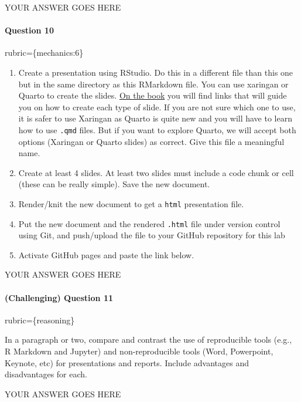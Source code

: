 \documentclass[
]{article}
\providecommand{\tightlist}{%
  \setlength{\itemsep}{0pt}\setlength{\parskip}{0pt}}
\begin{document}
YOUR ANSWER GOES HERE

\begin{alert alert-info}
\hypertarget{question-10}{%
\paragraph{Question 10}\label{question-10}}

rubric=\{mechanics:6\}

\begin{enumerate}
\def\labelenumi{\arabic{enumi}.}
\tightlist
\item
  Create a presentation using RStudio. Do this in a different file than
  this one but in the same directory as this RMarkdown file. You can use
  xaringan or Quarto to create the slides.
  \href{https://pages.github.ubc.ca/MDS-2022-23/DSCI_521_platforms-dsci_students/materials/lectures/8-rmarkdown-quarto-slides-ghpages.html}{On
  the book} you will find links that will guide you on how to create
  each type of slide. If you are not sure which one to use, it is safer
  to use Xaringan as Quarto is quite new and you will have to learn how
  to use \texttt{.qmd} files. But if you want to explore Quarto, we will
  accept both options (Xaringan or Quarto slides) as correct. Give this
  file a meaningful name.
\item
  Create at least 4 slides. At least two slides must include a code
  chunk or cell (these can be really simple). Save the new document.
\item
  Render/knit the new document to get a \texttt{html} presentation file.
\item
  Put the new document and the rendered \texttt{.html} file under
  version control using Git, and push/upload the file to your GitHub
  repository for this lab
\item
  Activate GitHub pages and paste the link below.
\end{enumerate}
\end{alert alert-info}

YOUR ANSWER GOES HERE

\begin{alert alert-info}
\hypertarget{challenging-question-11}{%
\paragraph{(Challenging) Question 11}\label{challenging-question-11}}

rubric=\{reasoning\}

In a paragraph or two, compare and contrast the use of reproducible
tools (e.g., R Markdown and Jupyter) and non-reproducible tools (Word,
Powerpoint, Keynote, etc) for presentations and reports. Include
advantages and disadvantages for each.
\end{alert alert-info}

YOUR ANSWER GOES HERE
\end{document}

